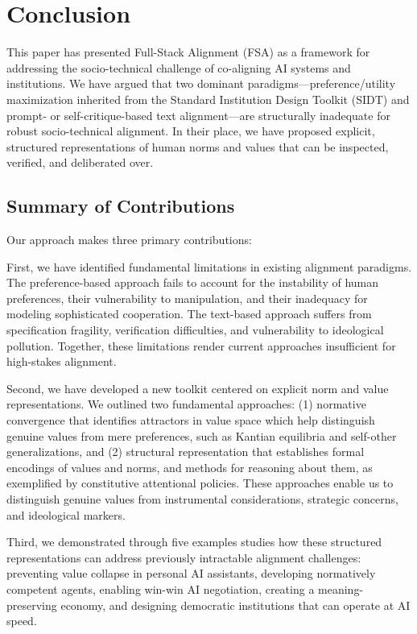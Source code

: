 \section{Conclusion}
This paper has presented Full-Stack Alignment (FSA) as a framework for addressing the socio-technical challenge of co-aligning AI systems and institutions. We have argued that two dominant paradigms—preference/utility maximization inherited from the Standard Institution Design Toolkit (SIDT) and prompt- or self-critique-based text alignment—are structurally inadequate for robust socio-technical alignment. In their place, we have proposed explicit, structured representations of human norms and values that can be inspected, verified, and deliberated over.

\subsection{Summary of Contributions}

Our approach makes three primary contributions:

First, we have identified fundamental limitations in existing alignment paradigms. The preference-based approach fails to account for the instability of human preferences, their vulnerability to manipulation, and their inadequacy for modeling sophisticated cooperation. The text-based approach suffers from specification fragility, verification difficulties, and vulnerability to ideological pollution. Together, these limitations render current approaches insufficient for high-stakes alignment.

Second, we have developed a new toolkit centered on explicit norm and value representations. We outlined two fundamental approaches: (1) normative convergence that identifies attractors in value space which help distinguish genuine values from mere preferences, such as Kantian equilibria and self-other generalizations, and (2) structural representation that establishes formal encodings of values and norms, and methods for reasoning about them, as exemplified by constitutive attentional policies. These approaches enable us to distinguish genuine values from instrumental considerations, strategic concerns, and ideological markers.

Third, we demonstrated through five examples studies how these structured representations can address previously intractable alignment challenges: preventing value collapse in personal AI assistants, developing normatively competent agents, enabling win-win AI negotiation, creating a meaning-preserving economy, and designing democratic institutions that can operate at AI speed.

